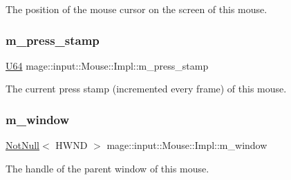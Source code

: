 The position of the mouse cursor on the screen of this mouse. \mbox{\label{classmage_1_1input_1_1_mouse_1_1_impl_a18304bef70290efaec61ad9eca140ce8}} 
\subsubsection{\texorpdfstring{m\+\_\+press\+\_\+stamp}{m\_press\_stamp}}
{\footnotesize\ttfamily \mbox{\hyperlink{namespacemage_a6672cf3c861707ce4a3235a3eb43941d}{U64}} mage\+::input\+::\+Mouse\+::\+Impl\+::m\+\_\+press\+\_\+stamp\hspace{0.3cm}{\ttfamily [private]}}

The current press stamp (incremented every frame) of this mouse. \mbox{\label{classmage_1_1input_1_1_mouse_1_1_impl_af478d106ce9e9e12ac32717c5523c7f5}} 
\subsubsection{\texorpdfstring{m\+\_\+window}{m\_window}}
{\footnotesize\ttfamily \mbox{\hyperlink{namespacemage_a8769f9d670d6b585ea306cb1062af94b}{Not\+Null}}$<$ H\+W\+ND $>$ mage\+::input\+::\+Mouse\+::\+Impl\+::m\+\_\+window\hspace{0.3cm}{\ttfamily [private]}}

The handle of the parent window of this mouse. 